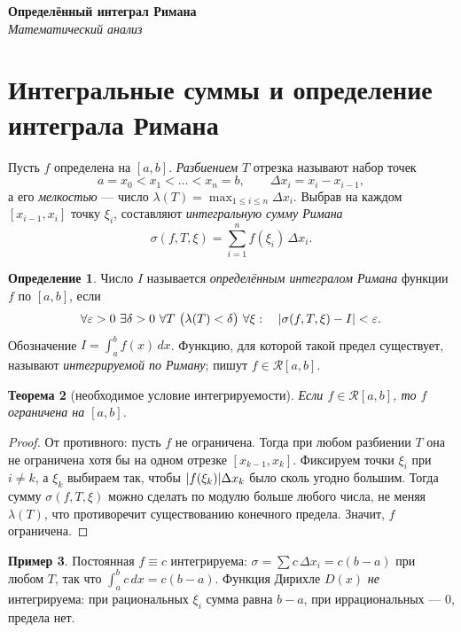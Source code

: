 \documentclass[11pt,a4paper]{article}
\newcommand{\coursename}{Математический анализ}
\newcommand{\doctitle}{Определённый интеграл Римана}
\theoremstyle{definition}
\newtheorem{definition}{Определение}[section]
\newtheorem{example}[definition]{Пример}
\theoremstyle{plain}
\newtheorem{theorem}[definition]{Теорема}
\newcommand{\dx}{\,dx}
\newcommand{\eps}{\varepsilon}
\renewcommand{\le}{\leqslant}
\DeclarePairedDelimiter{\abs}{\lvert}{\rvert}
\begin{document}
\begin{center}
  {\LARGE\bfseries \doctitle}\\[4pt]
  {\large\itshape \coursename}
\end{center}
\vspace{6pt}

\section{Интегральные суммы и определение интеграла Римана}

Пусть $f$ определена на $[a,b]$. \emph{Разбиением} $T$ отрезка называют набор точек
\[
  a=x_0<x_1<\dots<x_n=b,\qquad \Delta x_i=x_i-x_{i-1},
\]
а его \emph{мелкостью} — число $\lambda(T)=\max_{1\le i\le n}\Delta x_i$. Выбрав на каждом
$[x_{i-1},x_i]$ точку $\xi_i$, составляют \emph{интегральную сумму Римана}
\[
  \sigma(f,T,\xi)=\sum_{i=1}^{n} f(\xi_i)\,\Delta x_i .
\]

\begin{definition}
Число $I$ называется \emph{определённым интегралом Римана} функции $f$ по $[a,b]$, если
\[
  \forall\eps>0\ \exists\delta>0\ \forall T\ \bigl(\lambda(T)<\delta\bigr)\ \forall\xi:\quad
  \abs{\sigma(f,T,\xi)-I}<\eps .
\]
Обозначение $\displaystyle I=\int_a^b f(x)\dx$. Функцию, для которой такой предел существует,
называют \emph{интегрируемой по Риману}; пишут $f\in\mathcal R[a,b]$.
\end{definition}

\begin{theorem}[необходимое условие интегрируемости]
Если $f\in\mathcal R[a,b]$, то $f$ ограничена на $[a,b]$.
\end{theorem}

\begin{proof}
От противного: пусть $f$ не ограничена. Тогда при любом разбиении $T$ она не ограничена хотя бы
на одном отрезке $[x_{k-1},x_k]$. Фиксируем точки $\xi_i$ при $i\ne k$, а $\xi_k$ выбираем так,
чтобы $\abs{f(\xi_k)}\Delta x_k$ было сколь угодно большим. Тогда сумму $\sigma(f,T,\xi)$ можно
сделать по модулю больше любого числа, не меняя $\lambda(T)$, что противоречит существованию
конечного предела. Значит, $f$ ограничена.
\end{proof}

\begin{example}
Постоянная $f\equiv c$ интегрируема: $\sigma=\sum c\,\Delta x_i=c(b-a)$ при любом $T$, так что
$\int_a^b c\dx=c(b-a)$. Функция Дирихле $D(x)$ \emph{не} интегрируема: при рациональных $\xi_i$
сумма равна $b-a$, при иррациональных — $0$, предела нет.
\end{example}
\end{document}
